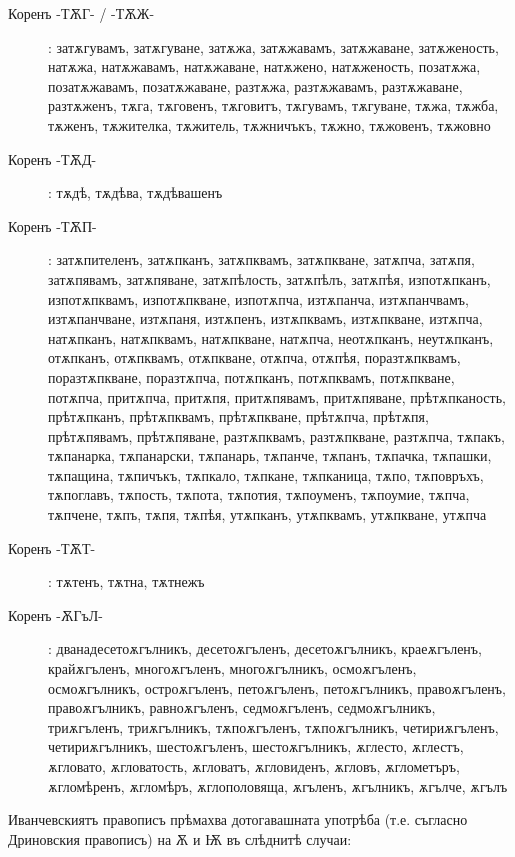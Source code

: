 \documentclass{article}
\begin{document}
\begin{description}
	\item[Коренъ -ТѪГ- / -ТѪЖ-]: затѫгувамъ, затѫгуване, затѫжа, затѫжавамъ, затѫжаване, затѫженость, натѫжа, натѫжавамъ, натѫжаване, натѫжено, натѫженость, позатѫжа, позатѫжавамъ, позатѫжаване, разтѫжа, разтѫжавамъ, разтѫжаване, разтѫженъ, тѫга, тѫговенъ, тѫговитъ, тѫгувамъ, тѫгуване, тѫжа, тѫжба, тѫженъ, тѫжителка, тѫжитель, тѫжничъкъ, тѫжно, тѫжовенъ, тѫжовно
	
	\item[Коренъ -ТѪД-]: тѫдѣ, тѫдѣва, тѫдѣвашенъ
	
	\item[Коренъ -ТѪП-]: затѫпителенъ, затѫпканъ, затѫпквамъ, затѫпкване, затѫпча, затѫпя, затѫпявамъ, затѫпяване, затѫпѣлость, затѫпѣлъ, затѫпѣя, изпотѫпканъ, изпотѫпквамъ, изпотѫпкване, изпотѫпча, изтѫпанча, изтѫпанчвамъ, изтѫпанчване, изтѫпаня, изтѫпенъ, изтѫпквамъ, изтѫпкване, изтѫпча, натѫпканъ, натѫпквамъ, натѫпкване, натѫпча, неотѫпканъ, неутѫпканъ, отѫпканъ, отѫпквамъ, отѫпкване, отѫпча, отѫпѣя, поразтѫпквамъ, поразтѫпкване, поразтѫпча, потѫпканъ, потѫпквамъ, потѫпкване, потѫпча, притѫпча, притѫпя, притѫпявамъ, притѫпяване, прѣтѫпканость, прѣтѫпканъ, прѣтѫпквамъ, прѣтѫпкване, прѣтѫпча, прѣтѫпя, прѣтѫпявамъ, прѣтѫпяване, разтѫпквамъ, разтѫпкване, разтѫпча, тѫпакъ, тѫпанарка, тѫпанарски, тѫпанарь, тѫпанче, тѫпанъ, тѫпачка, тѫпашки, тѫпащина, тѫпичъкъ, тѫпкало, тѫпкане, тѫпканица, тѫпо, тѫповръхъ, тѫпоглавъ, тѫпость, тѫпота, тѫпотия, тѫпоуменъ, тѫпоумие, тѫпча, тѫпчене, тѫпъ, тѫпя, тѫпѣя, утѫпканъ, утѫпквамъ, утѫпкване, утѫпча
	
	\item[Коренъ -ТѪТ-]: тѫтенъ, тѫтна, тѫтнежъ

	\item[Коренъ -ѪГъЛ-]: дванадесетоѫгълникъ, десетоѫгъленъ, десетоѫгълникъ, краеѫгъленъ, крайѫгъленъ, многоѫгъленъ, многоѫгълникъ, осмоѫгъленъ, осмоѫгълникъ, остроѫгъленъ, петоѫгъленъ, петоѫгълникъ, правоѫгъленъ, правоѫгълникъ, равноѫгъленъ, седмоѫгъленъ, седмоѫгълникъ, триѫгъленъ, триѫгълникъ, тѫпоѫгъленъ, тѫпоѫгълникъ, четириѫгъленъ, четириѫгълникъ, шестоѫгъленъ, шестоѫгълникъ, ѫглесто, ѫглестъ, ѫгловато, ѫгловатость, ѫгловатъ, ѫгловиденъ, ѫгловъ, ѫглометъръ, ѫгломѣренъ, ѫгломѣръ, ѫглополовяща, ѫгъленъ, ѫгълникъ, ѫгълче, ѫгълъ

 	\end{description}

Иванчевскиятъ правописъ прѣмахва дотогавашната употрѣба (т.е. съгласно Дриновския правописъ) на Ѫ и Ѭ въ слѣднитѣ случаи:
\end{document}
